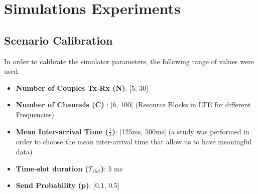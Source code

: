 \section{Simulations Experiments}
\subsection{Scenario Calibration}
In order to calibrate the simulator parameters, the following range of values were used:
\begin{itemize}
	\item \textbf{Number of Couples Tx-Rx (N)}: [5, 30]
	\item \textbf{Number of Channels (C)} : [6, 100] (Resource Blocks in LTE for different Frequencies)
	\item \textbf{Mean Inter-arrival Time ($\frac{1}{\lambda}$)}: [125ms, 500ms] (a study was performed in order to choose the mean inter-arrival time that allow us to have meaningful data)   
	\item \textbf{Time-slot duration ($T_{slot}$)}: 5 ms
	\item \textbf{Send Probability (p)}: [0.1, 0.5] 
\end{itemize}

